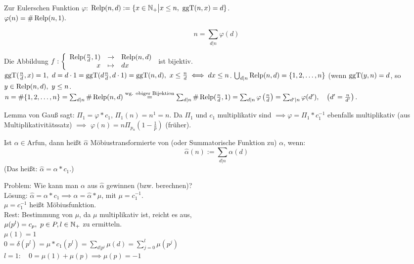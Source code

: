 \documentclass[a4paper,DIV15,BCOR12mm]{article}
\begin{document}
Zur Eulerschen Funktion $\varphi$:
$\mathop{\rm Relp}\nolimits(n,d):=\{x\in\mathbb{N}_+\big|x\leq
n,\ \mathop{\rm ggT}\nolimits(n,x)=d\}$.\\
$\varphi(n)=\#\mathop{\rm Relp}\nolimits(n,1).$
\begin{lemma}[Gauß]
    $$n=\sum_{d|n}\varphi(d)$$
\end{lemma}
\begin{beweis}
    Die Abbildung $f:\left\{\begin{array}{rcl}\mathop{\rm Relp}\nolimits(\frac nd,1)
    &\to& \mathop{\rm Relp}\nolimits(n,d)\\ x &\mapsto& dx\end{array} \right.$ ist
    bijektiv.\\
    $\mathop{\rm ggT}\nolimits(\frac nd,x)=1,\ d=d\cdot 1=\mathop{\rm ggT}\nolimits(d \frac n d, d\cdot
    1)=\mathop{\rm ggT}\nolimits(n,d),\ x\leq \frac nd \iff dx\leq n$. $\bigcup_{d|n}
    \mathop{\rm Relp}\nolimits(n,d)=\{1,2,\dotsc,n\}$ (wenn $\mathop{\rm ggT}\nolimits(y,n)=d$, so $y \in
    \mathop{\rm Relp}\nolimits(n,d),\ y\leq n$.\\
    $n=\#\{1,2,\dotsc,n\}=\sum_{d|n}\# \mathop{\rm Relp}\nolimits(n,d)\stackrel{\text{wg. obiger Bijektion}}{=}\sum_{d|n}
    \#\mathop{\rm Relp}\nolimits(\frac nd,1)=\sum_{d|n}\varphi\left( \frac{n}{d}
    \right)=\sum_{d'|n}\varphi(d'),\quad \left(d'=\frac
    {n}{d'}\right).$
\end{beweis}
Lemma von Gauß sagt: $\Pi_1=\varphi * c_1$, $\Pi_1(n)=n^1=n$. Da
$\Pi_1$ und $c_1$ multiplikativ sind $\implies \varphi=\Pi_1 *
c_1^{-1}$ ebenfalls multiplikativ (aus Multiplikativitätssatz)
$\implies$ $\varphi(n)=n \Pi_{p_n}(1-\frac 1 p)$ (früher).
\begin{definition}
    Ist $\alpha \in \text{Arfun}$, dann heißt $\hat{\alpha}$
    Möbiustransformierte von (oder Summatorische Funktion zu)
    $\alpha$, wenn:
    $$
        \hat{\alpha}(n):=\sum_{d|n}\alpha(d)
    $$
    (Das heißt: $\hat{\alpha}=\alpha * c_1$.)
\end{definition}
Problem: Wie kann man $\alpha$ aus $\hat{\alpha}$ gewinnen (bzw. berechnen)?\\
Lösung: $\hat{\alpha}=\alpha * c_1 \implies \alpha=\hat{\alpha} * \mu$, mit $\mu=c_1^{-1}$.\\
$\mu=c_1^{-1}$ heißt Möbiusfunktion.\\
Rest: Bestimmung von $\mu$, da $\mu$ multiplikativ ist, reicht es aus,\\
$\mu(p^l)=c_p,\ p\in P, l \in \mathbb{N}_+$ zu ermitteln.\\
$\mu(1)=1$\\
$0=\delta(p^l)=\mu*c_1(p^l)=\sum_{d|p^l}\mu(d)=\sum_{j=0}^l\mu(p^j)$\\
$l=1:\quad 0=\mu(1)+\mu(p)\implies \mu(p)=-1$\\
\end{document}
